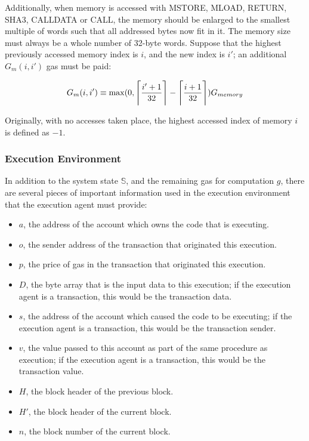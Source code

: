 \documentclass[9pt,oneside]{amsart}
\DeclarePairedDelimiter{\ceil}{\lceil}{\rceil}
\begin{document}
\begin{multicols}{2}
Additionally, when memory is accessed with {\small MSTORE}, {\small MLOAD}, {\small RETURN}, {\small SHA3}, {\small CALLDATA} or {\small CALL}, the memory should be enlarged to the smallest multiple of words such that all addressed bytes now fit in it. The memory size must always be a whole number of 32-byte words. Suppose that the highest previously accessed memory index is $i$, and the new index is $i'$; an additional $G_{m}(i, i')$ gas must be paid:

\begin{equation}
G_{m}(i, i') \equiv \max(0, \ceil[\Bigg]{\frac{i'+1}{32}} - \ceil[\Bigg]{\frac{i+1}{32}}) G_{memory}
\end{equation}

Originally, with no accesses taken place, the highest accessed index of memory $i$ is defined as $-1$.


\subsubsection{Execution Environment}

In addition to the system state $\mathbb{S}$, and the remaining gas for computation $g$, there are several pieces of important information used in the execution environment that the execution agent must provide:

\begin{itemize}
\item $a$, the address of the account which owns the code that is executing.
\item $o$, the sender address of the transaction that originated this execution.
\item $p$, the price of gas in the transaction that originated this execution.
\item $D$, the byte array that is the input data to this execution; if the execution agent is a transaction, this would be the transaction data.
\item $s$, the address of the account which caused the code to be executing; if the execution agent is a transaction, this would be the transaction sender.
\item $v$, the value passed to this account as part of the same procedure as execution; if the execution agent is a transaction, this would be the transaction value.
\item $H$, the block header of the previous block.
\item $H'$, the block header of the current block.
\item $n$, the block number of the current block.
\end{itemize}


\end{multicols}
\end{document}
